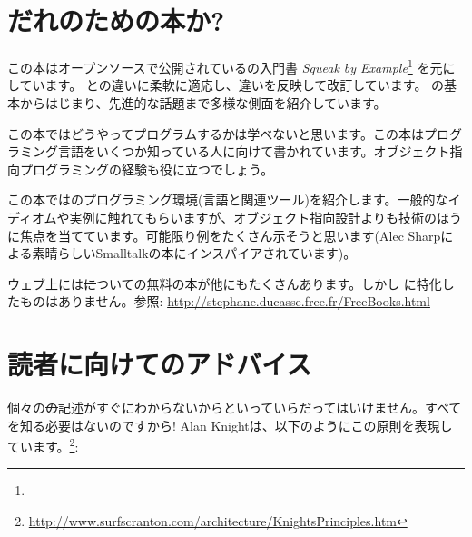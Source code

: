 \documentclass[a4paper,10pt,twoside]{book}
\begin{document}
\section*{だれのための本か?}

この本はオープンソースで公開されている\squeak の入門書 \emph{Squeak by Example}\footnote{\sbe} を元にしています。
\pharo と\squeak の違いに柔軟に適応し、違いを反映して改訂しています。
\pharo の基本からはじまり、先進的な話題まで多様な側面を紹介しています。

この本ではどうやってプログラムするかは学べないと思います。この本はプログラミング言語をいくつか知っている人に向けて書かれています。オブジェクト指向プログラミングの経験も役に立つでしょう。

この本では\pharo のプログラミング環境(言語と関連ツール)を紹介します。一般的なイディオムや実例に触れてもらいますが、オブジェクト指向設計よりも技術のほうに焦点を当てています。可能限り例をたくさん示そうと思います(Alec Sharpによる素晴らしいSmalltalkの本\cite{Shar97a}にインスパイアされています)。

ウェブ上には\st についての無料の本が他にもたくさんあります。しかし \pharo に特化したものはありません。参照:
\url{http://stephane.ducasse.free.fr/FreeBooks.html}

\ifluluelse{}{\newpage} %
\section*{読者に向けてのアドバイス}


個々の\st の記述がすぐにわからないからといっていらだってはいけません。すべてを知る必要はないのですから!
Alan Knightは、以下のようにこの原則を表現しています。\footnote{\url{http://www.surfscranton.com/architecture/KnightsPrinciples.htm}}:

\end{document}
